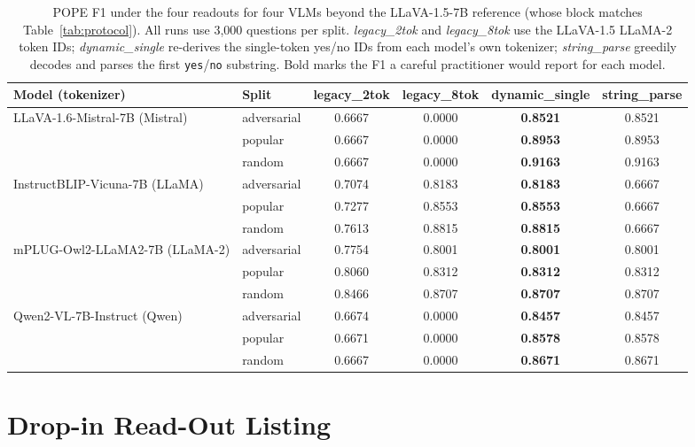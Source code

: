 \documentclass{article}
\begin{document}
\begin{table}[h]
\caption{POPE F1 under the four readouts for four VLMs beyond the
LLaVA-1.5-7B reference (whose block matches Table~\ref{tab:protocol}).
All runs use 3{,}000 questions per split. \emph{legacy\_2tok} and
\emph{legacy\_8tok} use the LLaVA-1.5 LLaMA-2 token IDs;
\emph{dynamic\_single} re-derives the single-token yes/no IDs from each
model's own tokenizer; \emph{string\_parse} greedily decodes and parses
the first \texttt{yes}/\texttt{no} substring. Bold marks the F1 a careful
practitioner would report for each model.}
\label{tab:multimodel}
\centering
\small
\begin{tabular}{llcccc}
\toprule
Model (tokenizer) & Split & legacy\_2tok & legacy\_8tok & dynamic\_single & string\_parse \\
\midrule
\multirow{3}{*}{LLaVA-1.6-Mistral-7B (Mistral)}
 & adversarial & 0.6667 & 0.0000 & \textbf{0.8521} & 0.8521 \\
 & popular     & 0.6667 & 0.0000 & \textbf{0.8953} & 0.8953 \\
 & random      & 0.6667 & 0.0000 & \textbf{0.9163} & 0.9163 \\
\midrule
\multirow{3}{*}{InstructBLIP-Vicuna-7B (LLaMA)}
 & adversarial & 0.7074 & 0.8183 & \textbf{0.8183} & 0.6667 \\
 & popular     & 0.7277 & 0.8553 & \textbf{0.8553} & 0.6667 \\
 & random      & 0.7613 & 0.8815 & \textbf{0.8815} & 0.6667 \\
\midrule
\multirow{3}{*}{mPLUG-Owl2-LLaMA2-7B (LLaMA-2)}
 & adversarial & 0.7754 & 0.8001 & \textbf{0.8001} & 0.8001 \\
 & popular     & 0.8060 & 0.8312 & \textbf{0.8312} & 0.8312 \\
 & random      & 0.8466 & 0.8707 & \textbf{0.8707} & 0.8707 \\
\midrule
\multirow{3}{*}{Qwen2-VL-7B-Instruct (Qwen)}
 & adversarial & 0.6674 & 0.0000 & \textbf{0.8457} & 0.8457 \\
 & popular     & 0.6671 & 0.0000 & \textbf{0.8578} & 0.8578 \\
 & random      & 0.6667 & 0.0000 & \textbf{0.8671} & 0.8671 \\
\bottomrule
\end{tabular}
\end{table}

\section{Drop-in Read-Out Listing}
\label{app:snippet}
\end{document}
